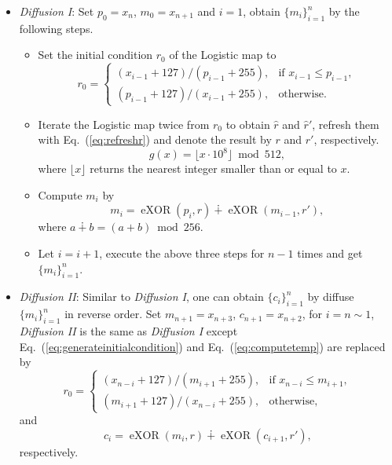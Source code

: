 \documentclass[3p,preprint,11pt]{elsarticle}
\DeclareMathOperator{\eXOR}{eXOR}
\begin{document}
\begin{itemize}
\item \textit{Diffusion I}:
Set $p_0 = x_n$, $m_0=x_{n+1}$ and $i=1$, obtain $\{m_i\}_{i=1}^n$ by the following steps.
        \begin{itemize}
        \item  Set the initial condition $r_0$ of the Logistic map to
            \begin{equation}
            r_0 =
            \begin{cases}
            (x_{i-1} + 127)/(p_{i-1}+255),     & \text{if } x_{i-1} \leq p_{i-1},\\
            (p_{i-1} + 127)/(x_{i-1}+255), & \text{otherwise}.
            \end{cases}
            \label{eq:generateinitialcondition}
            \end{equation}

        \item   Iterate the Logistic map twice from $r_0$ to obtain $\hat{r}$ and $\hat{r}'$, refresh them        with Eq.~(\ref{eq:refreshr}) and denote the result by $r$ and $r'$, respectively.
            \begin{equation}
            g(x) = \lfloor x \cdot 10^8  \rfloor \bmod 512 ,
            \label{eq:refreshr}
            \end{equation}
            where $\lfloor x  \rfloor$ returns the nearest integer smaller than or equal to $x$.
        \item  Compute $m_i$ by
        \begin{equation}
        m_i = \eXOR(p_i,r) \dotplus \eXOR(m_{i-1},r'),
        \label{eq:computetemp}
        \end{equation}
        where $a \dotplus b = (a+b) \bmod 256$.
        \item Let $i=i+1$, execute the above three steps for $n-1$ times and get $\{m_i\}_{i=1}^n$.
        \end{itemize}

\item \textit{Diffusion II}: Similar to \textit{Diffusion I}, one can obtain $\{c_i\}_{i=1}^n$ by
diffuse $\{m_i\}_{i=1}^{n}$ in reverse order. Set $m_{n+1}= x_{n+3}$, $c_{n+1} = x_{n+2}$, for
$i = n \sim 1$, \textit{Diffusion II} is the same as \textit{Diffusion I} except Eq.~(\ref{eq:generateinitialcondition}) and
Eq.~(\ref{eq:computetemp}) are replaced by
\begin{equation*}
            r_0 =
            \begin{cases}
            (x_{n-i} + 127)/(m_{i+1}+255),     & \text{if } x_{n-i} \leq m_{i+1},\\
            (m_{i+1} + 127)/(x_{n-i}+255), & \text{otherwise},
            \end{cases}
\end{equation*}
and
\begin{equation}
        c_i = \eXOR(m_i,r) \dotplus \eXOR(c_{i+1},r'),
        \label{eq:computecipher}
\end{equation}
respectively.
\end{itemize}
\end{document}
